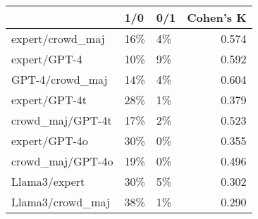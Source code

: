 \begin{table}
\label{tab:crosstab}
\begin{tabular}{lllr}
\toprule
 & 1/0 & 0/1 & Cohen's K \\
\midrule
expert/crowd\_maj & 16\% & 4\% & 0.574 \\
expert/GPT-4 & 10\% & 9\% & 0.592 \\
GPT-4/crowd\_maj & 14\% & 4\% & 0.604 \\
expert/GPT-4t & 28\% & 1\% & 0.379 \\
crowd\_maj/GPT-4t & 17\% & 2\% & 0.523 \\
expert/GPT-4o & 30\% & 0\% & 0.355 \\
crowd\_maj/GPT-4o & 19\% & 0\% & 0.496 \\
Llama3/expert & 30\% & 5\% & 0.302 \\
Llama3/crowd\_maj & 38\% & 1\% & 0.290 \\
\bottomrule
\end{tabular}
\end{table}
